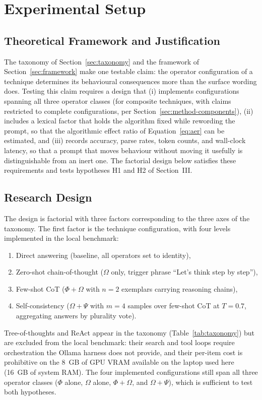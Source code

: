 \documentclass[conference]{IEEEtran}
\begin{document}
\section{Experimental Setup}
\label{sec:setup}

\subsection{Theoretical Framework and Justification}
\label{sec:method-framework}

The taxonomy of Section~\ref{sec:taxonomy} and the framework of
Section~\ref{sec:framework} make one testable claim: the operator
configuration of a technique determines its behavioural consequences
more than the surface wording does.  Testing this claim requires a
design that (i) implements configurations spanning all three operator
classes (for composite techniques, with claims restricted to complete
configurations, per Section~\ref{sec:method-components}), (ii) includes
a lexical factor that holds the algorithm fixed while rewording the
prompt, so that the algorithmic effect ratio of
Equation~\eqref{eq:aer} can be estimated, and (iii) records accuracy,
parse rates, token counts, and wall-clock latency, so that a prompt
that moves behaviour without moving it usefully is distinguishable
from an inert one.  The factorial design below satisfies these
requirements and tests hypotheses H1 and H2 of Section~III.

\subsection{Research Design}
\label{sec:method-design}

The design is factorial with three factors corresponding to the three
axes of the taxonomy.  The first factor is the technique
configuration, with four levels implemented in the local benchmark:
\begin{enumerate}
    \item Direct answering (baseline, all operators set to identity),
    \item Zero-shot chain-of-thought ($\Omega$ only, trigger phrase ``Let's think step by step''),
    \item Few-shot CoT ($\Phi + \Omega$ with $n = 2$ exemplars carrying reasoning chains),
    \item Self-consistency ($\Omega + \Psi$ with $m = 4$ samples over few-shot CoT at $T = 0.7$, aggregating answers by plurality vote).
\end{enumerate}
Tree-of-thoughts and ReAct appear in the taxonomy
(Table~\ref{tab:taxonomy}) but are excluded from the local benchmark:
their search and tool loops require orchestration the Ollama harness
does not provide, and their per-item cost is prohibitive on the 8~GB
of GPU VRAM available on the laptop used here (16~GB of system RAM).
The four implemented configurations still span all three operator
classes ($\Phi$ alone, $\Omega$ alone, $\Phi+\Omega$, and
$\Omega+\Psi$), which is sufficient to test both hypotheses.
\end{document}
